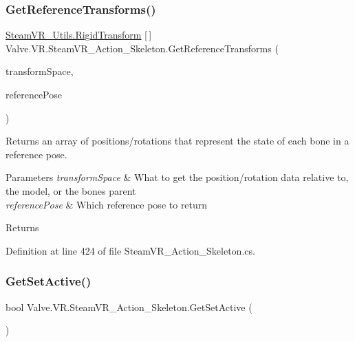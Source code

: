 \subsubsection{\texorpdfstring{GetReferenceTransforms()}{GetReferenceTransforms()}}
{\footnotesize\ttfamily \mbox{\hyperlink{struct_valve_1_1_v_r_1_1_steam_v_r___utils_1_1_rigid_transform}{Steam\+V\+R\+\_\+\+Utils.\+Rigid\+Transform}} \mbox{[}$\,$\mbox{]} Valve.\+V\+R.\+Steam\+V\+R\+\_\+\+Action\+\_\+\+Skeleton.\+Get\+Reference\+Transforms (\begin{DoxyParamCaption}\item[{\mbox{\hyperlink{namespace_valve_1_1_v_r_a916744fb3fc7b8e8ba224fba9bee6de4}{E\+V\+R\+Skeletal\+Transform\+Space}}}]{transform\+Space,  }\item[{\mbox{\hyperlink{namespace_valve_1_1_v_r_a299b655881f873256f035349b59da09e}{E\+V\+R\+Skeletal\+Reference\+Pose}}}]{reference\+Pose }\end{DoxyParamCaption})}



Returns an array of positions/rotations that represent the state of each bone in a reference pose. 


\begin{DoxyParams}{Parameters}
{\em transform\+Space} & What to get the position/rotation data relative to, the model, or the bone\textquotesingle{}s parent\\
\hline
{\em reference\+Pose} & Which reference pose to return\\
\hline
\end{DoxyParams}
\begin{DoxyReturn}{Returns}

\end{DoxyReturn}


Definition at line 424 of file Steam\+V\+R\+\_\+\+Action\+\_\+\+Skeleton.\+cs.

\mbox{\label{class_valve_1_1_v_r_1_1_steam_v_r___action___skeleton_ad21ee279c89b6e30eb8f8de7c5c2c450}} 
\subsubsection{\texorpdfstring{GetSetActive()}{GetSetActive()}}
{\footnotesize\ttfamily bool Valve.\+V\+R.\+Steam\+V\+R\+\_\+\+Action\+\_\+\+Skeleton.\+Get\+Set\+Active (\begin{DoxyParamCaption}{ }\end{DoxyParamCaption})}



